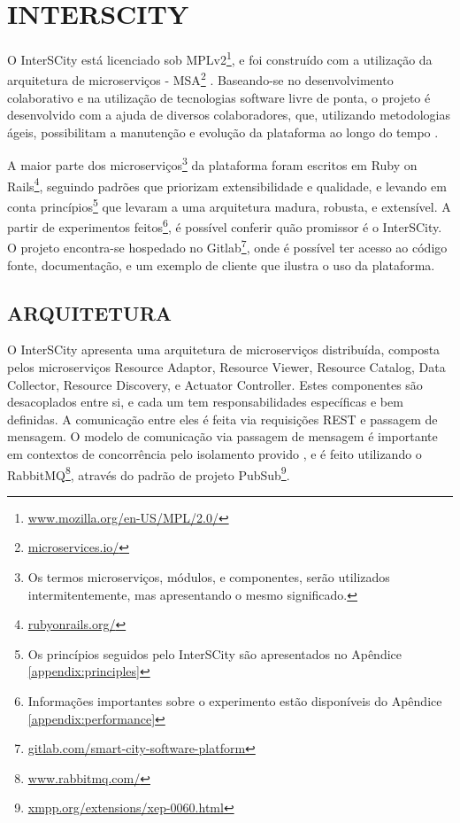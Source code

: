 \chapter[INTERSCITY]{INTERSCITY}
\label{chapter:interscity}

O InterSCity está licenciado sob MPLv2\footnote{\url{www.mozilla.org/en-US/MPL/2.0/}},
e foi construído com a utilização da arquitetura de microserviços -
MSA\footnote{\url{microservices.io/}}
\cite{delesposte2017}. Baseando-se no desenvolvimento colaborativo e na
utilização de tecnologias software livre de ponta, o projeto é desenvolvido
com a ajuda de diversos colaboradores, que, utilizando metodologias ágeis,
possibilitam a manutenção e evolução da plataforma ao longo do tempo \cite{delesposte2017}.

A maior parte dos microserviços\footnote{Os termos microserviços, módulos, e
componentes, serão utilizados intermitentemente, mas apresentando o mesmo
significado.} da plataforma foram escritos em Ruby on Rails\footnote{\url{rubyonrails.org/}},
seguindo padrões que priorizam extensibilidade e qualidade, e levando em conta
princípios\footnote{Os princípios seguidos pelo InterSCity são apresentados no
Apêndice \ref{appendix:principles}} que levaram a uma arquitetura madura,
robusta, e extensível. A partir de experimentos feitos\footnote{Informações
importantes sobre o experimento estão disponíveis do Apêndice \ref{appendix:performance}
}, é possível conferir quão promissor é o InterSCity. O projeto encontra-se
hospedado no Gitlab\footnote{\url{gitlab.com/smart-city-software-platform}},
onde é possível ter acesso ao código fonte, documentação, e um exemplo de
cliente que ilustra o uso da plataforma.

\section{ARQUITETURA}

O InterSCity apresenta uma arquitetura de microserviços distribuída, composta
pelos microserviços Resource Adaptor, Resource Viewer, Resource Catalog,
Data Collector, Resource Discovery, e Actuator Controller. Estes componentes
são desacoplados entre si, e cada um tem responsabilidades específicas e bem
definidas. A comunicação entre eles é feita via requisições REST e passagem de
mensagem. O modelo de comunicação via passagem de mensagem é importante em
contextos de concorrência pelo isolamento provido \cite{armstrong2003}, e é
feito utilizando o RabbitMQ\footnote{\url{www.rabbitmq.com/}}, através do
padrão de projeto PubSub\footnote{\url{xmpp.org/extensions/xep-0060.html}}.

